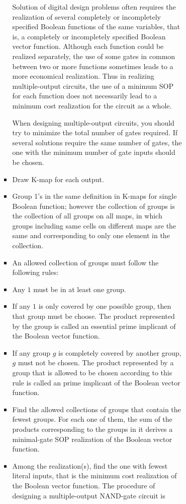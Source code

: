 \documentclass[a4paper,12pt]{article}
\begin{document}
\begin{itemize}
\begin{itemize}
\begin{itemize}
\begin{itemize}
\begin{itemize}
\begin{itemize}
\begin{itemize}
Solution of digital design problems often requires the realization of several completely or incompletely specified Boolean functions of the same variables, that is, a completely or incompletely specified Boolean vector function. Although each function could be realized separately, the use of some gates in common between two or more functions sometimes leads to a more economical realization. Thus in realizing multiple-output circuits, the use of a minimum SOP for each function does not necessarily lead to a minimum cost realization for the circuit as a whole.

When designing multiple-output circuits, you should try to minimize the total number of gates required. If several solutions require the same number of gates, the one with the minimum number of gate inputs should be chosen.
\ben
\item Draw K-map for each output.
\item Group 1's in the same definition in K-maps for single Boolean function; however the collection of groups is the collection of all groups on all maps, in which groups including same cells on different maps are the same and corresponding to only one element in the collection.
\item An allowed collection of groups must follow the following rules:
\bit
\item Any $1$ must be in at least one group.
\item If any $1$ is only covered by one possible group, then that group must be choose. The product represented by the group is called an essential prime implicant of the Boolean vector function.
\item If any group $g$ is completely covered by another group, $g$ must not be chosen. The product represented by a group that is allowed to be chosen according to this rule is called an prime implicant of the Boolean vector function.
\eit
\item Find the allowed collections of groups that contain the fewest groups. For each one of them, the sum of the products corresponding to the groups in it derives a minimal-gate SOP realization of the Boolean vector function.
\item Among the realization(s), find the one with fewest literal inputs, that is the minimum cost realization of the Boolean vector function.
\een
{}
The procedure of designing a multiple-output NAND-gate circuit is

\end{itemize}
\end{itemize}
\end{itemize}
\end{itemize}
\end{itemize}
\end{itemize}
\end{itemize}
\end{document}
